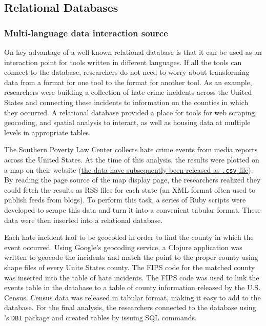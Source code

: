 \documentclass[]{article}
\begin{document}
\subsection{Relational Databases}

\subsubsection{Multi-language data interaction source}

On key advantage of a well known relational database is that it can be used as
an interaction point for tools written in different languages. If all the
tools can connect to the database, researchers do not need to worry about
transforming data from a format for one tool to the format for another tool.
As an example, researchers were building a collection of hate crime incidents
across the United States and connecting these incidents to information on the
counties in which they occurred. A relational database provided a place for
tools for web scraping, geocoding, and spatial analysis to interact, as well
as housing data at multiple levels in appropriate tables.

The Southern Poverty Law Center collects hate crime events from media reports
across the United States. At the time of this analysis, the results were plotted
on a map on their website
(\href{http://www.splcenter.org/get-informed/hate-incidents}{the data have subsequently been released as
\texttt{.csv} file}). By reading the page source of the map display page, the
researchers realized they could fetch the results as RSS files for each state
(an XML format often used to publish feeds from blogs).
To perform this task, a series of Ruby scripts were developed to scrape this
data and turn it into a convenient tabular format. These data were then
inserted into a relational database.

Each hate incident had to be geocoded in order to find the county in which the
event occurred. Using Google's geocoding service, a Clojure application was
written to geocode the incidents and match the point to the proper county
using shape files of every Unite States county. The FIPS code for the matched
county was inserted into the table of hate incidents.
The FIPS code was used to link the events table in the database to a table of
county information released by the U.S. Census. Census data was released in
tabular format, making it easy to add to the database. For the final analysis,
the researchers connected to the database using \R's \texttt{DBI} package and
created tables by issuing SQL commands.
\end{document}
